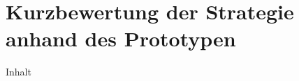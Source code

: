 \section{Kurzbewertung der Strategie anhand des Prototypen}
\label{sec:06-03_brief-evaluation-of-strategy-based-on-prototype}

Inhalt
